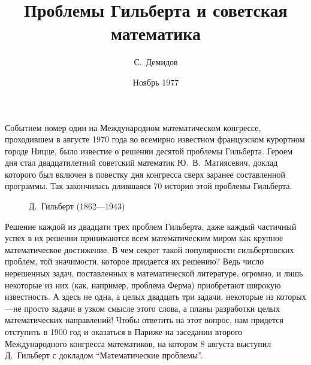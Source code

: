 \documentclass[twocolumn,10pt]{article}
\begin{document}
\renewcommand{\refname}{Литература}
\newcommand{\stars}{

\begin{center}***\end{center}

}
\title{Проблемы Гильберта и советская математика}
\author{С.~Демидов}
\date{Ноябрь 1977}
\maketitle
Событием номер один на Международном математическом конгрессе, проходившем в августе 1970 года во всемирно известном французском курортном городе Ницце, было известие о решении десятой проблемы Гильберта. Героем дня стал двадцатилетний советский математик Ю.~В.~Матиясевич, доклад которого был включен в повестку дня конгресса сверх заранее составленной программы. Так закончилась длившаяся 70 история этой проблемы Гильберта.
\begin{figure}[ht]
\begin{center}
\end{center}
\caption{Д.~Гильберт (1862---1943)}
\end{figure}

Решение каждой из двадцати трех проблем Гильберта, даже каждый частичный успех в их решении принимаются всем математическим миром как крупное математическое достижение. В чем секрет такой популярности гильбертовских проблем, той значимости, которое придается их решению? Ведь число нерешенных задач, поставленных в математической литературе, огромно, и лишь некоторые из них (как, например, проблема Ферма) приобретают широкую известность. А здесь не одна, а целых двадцать три задачи, некоторые из которых---не просто задачи в узком смысле этого слова, а планы разработки целых математических направлений! Чтобы ответить на этот вопрос, нам придется отступить в 1900 год и оказаться в Париже на заседании второго Международного конгресса математиков, на котором 8 августа выступил Д.~Гильберт с докладом ``Математические проблемы''.
\end{document}
